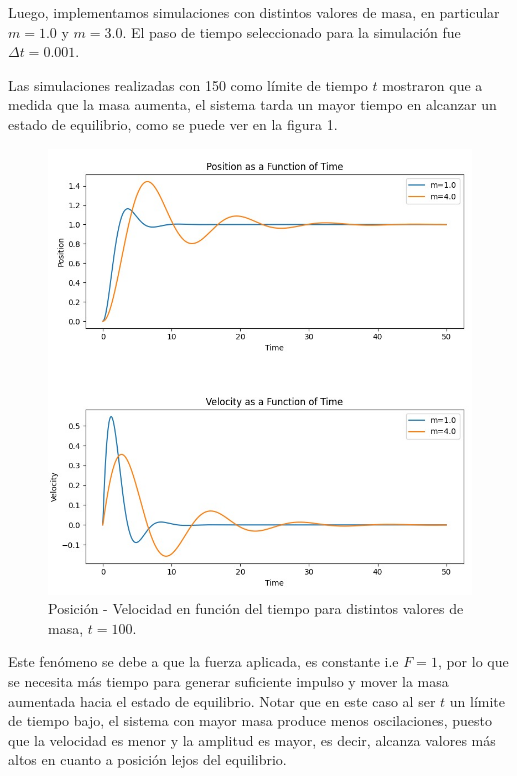 \documentclass[]{article}
\begin{document}
Luego, implementamos simulaciones con distintos valores de masa, en particular $m = 1.0$ y $m = 3.0$. El paso de tiempo seleccionado para la simulación fue $\Delta t= 0.001$.

Las simulaciones realizadas con 150 como límite de tiempo $t$ mostraron que a medida que la masa aumenta, el sistema tarda un mayor tiempo en alcanzar un estado de equilibrio, como se puede ver en la figura 1.



\begin{figure}[H]
\centering
\includegraphics[width=\textwidth]{../assets/figure_1_mass.jpeg}
\caption{Posición - Velocidad en función del tiempo para distintos valores de masa, $t = 100$.}
\end{figure}


Este fenómeno se debe a que la fuerza aplicada, es constante i.e $F = 1$, por lo que se necesita más tiempo para generar suficiente impulso y mover la masa aumentada hacia el estado de equilibrio. Notar que en este caso al ser $t$ un límite de tiempo bajo, el sistema con mayor masa produce menos oscilaciones, puesto que la velocidad es menor y la amplitud es mayor, es decir, alcanza valores más altos en cuanto a posición lejos del equilibrio.\\
\end{document}
